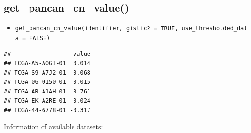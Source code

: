\documentclass[
]{book}
\newenvironment{Shaded}{\begin{snugshade}}{\end{snugshade}}
\newcommand{\AttributeTok}[1]{\textcolor[rgb]{0.13,0.29,0.53}{#1}}
\newcommand{\FunctionTok}[1]{\textcolor[rgb]{0.13,0.29,0.53}{\textbf{#1}}}
\newcommand{\NormalTok}[1]{#1}
\newcommand{\OtherTok}[1]{\textcolor[rgb]{0.56,0.35,0.01}{#1}}
\newcommand{\SpecialCharTok}[1]{\textcolor[rgb]{0.81,0.36,0.00}{\textbf{#1}}}
\newcommand{\StringTok}[1]{\textcolor[rgb]{0.31,0.60,0.02}{#1}}
\providecommand{\tightlist}{%
  \setlength{\itemsep}{0pt}\setlength{\parskip}{0pt}}
\begin{document}
\subsection{get\_pancan\_cn\_value()}\label{get_pancan_cn_value}

\begin{itemize}
\tightlist
\item
  \texttt{get\_pancan\_cn\_value(identifier,\ gistic2\ =\ TRUE,\ use\_thresholded\_data\ =\ FALSE)}
\end{itemize}

\begin{Shaded}
\end{Shaded}

\begin{verbatim}
##                  value
## TCGA-A5-A0GI-01  0.014
## TCGA-S9-A7J2-01  0.068
## TCGA-06-0150-01  0.015
## TCGA-AR-A1AH-01 -0.761
## TCGA-EK-A2RE-01 -0.024
## TCGA-44-6778-01 -0.317
\end{verbatim}

Information of available datasets:
\end{document}
